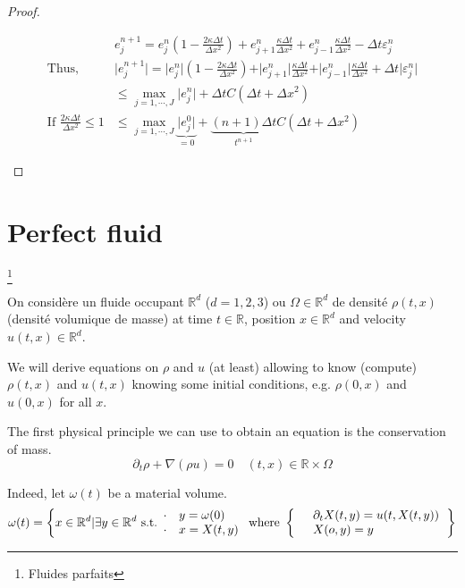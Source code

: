 \documentclass{report}
\newcommand{\R}{\ensuremath{\mathbb{R}}} %
\theoremstyle{plain}
\theoremstyle{definition}
\theoremstyle{remark}
\begin{document}
\begin{proof}
\begin{itemize}
\begin{align*}
	& e^{n+1}_j = e^n_j\left( 1 -
	\frac{2\kappa\Delta t}{\Delta x^2} \right) 
	+ e^{n}_{j+1} \frac{\kappa\Delta t}{\Delta x^2}  
	+ e^{n}_{j-1} \frac{\kappa\Delta t}{\Delta x^2} 
 	- \Delta t \varepsilon^n_j\\
	\text{Thus, }
	&\vert e^{n+1}_j\vert = \vert  e^n_j \vert  \left( 1 -
	\frac{2\kappa\Delta t}{\Delta x^2} \right) 
	+ \vert e^{n}_{j+1}\vert  \frac{\kappa\Delta t}{\Delta x^2}  
	+ \vert e^{n}_{j-1}\vert  \frac{\kappa\Delta t}{\Delta x^2} 
 	+ \Delta t \vert  \varepsilon^n_j\vert \\
	&\le \max_{j=1,\cdots, J} \vert e^n_j\vert 
	+ \Delta t C (\Delta t +\Delta x^2)\\
	\text{If } 	\frac{2\kappa\Delta t}{\Delta x^2} \le 1
	&\le \max_{j=1,\cdots, J} \underbrace{\vert e^0_j\vert}_{=0}
	+ \underbrace{(n+1)\Delta t}_{t^{n+1}}
	C (\Delta t +\Delta x^2)
\end{align*}
\end{itemize}
\end{proof}



\chapter{Perfect fluid}
\footnote{Fluides parfaits}

On considère un fluide occupant $\R^d$ ($d=1,2,3$) ou
$\Omega\in\R^d$ de densité $\rho(t,x)$ (densité
volumique de masse) at time $t\in\R$, position $x\in\R^d$
and velocity $u(t,x)\in\R^d$.

We will derive equations on $\rho$ and $u$ (at least)
allowing to know (compute) $\rho(t,x)$ and $u(t,x)$
knowing some initial conditions, e.g.  $\rho(0,x)$ and
$u(0,x)$ for all $x$.

The first physical principle we can use to obtain an
equation is the conservation of mass.
\begin{equation}
	\partial_t\rho + \nabla(\rho u ) = 0
	\quad (t,x)\in\R\times\Omega
\end{equation}

Indeed, let $\omega(t)$ be a material volume.
\begin{equation}
	\omega(t) = \left\{ 
		x\in\R^d \vert \exists y\in\R^d 
	\text{ s.t.}
		\begin{array}[ ]{cl}
		\cdot & y= \omega(0) \\
		\cdot & x =X(t,y)
		\end{array} 
	\text{ where } \left\lbrace
		\begin{array}[ ]{cl}
		& \partial_t X(t,y) = u(t,X(t,y))\\
		& X(o,y) = y	
		\end{array} \right.
	\right\}
\end{equation}
\end{document}
